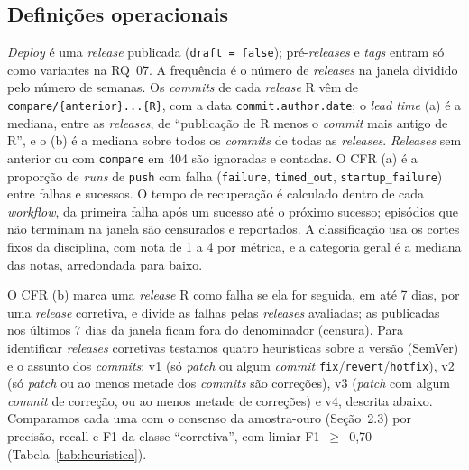
\subsection{Definições operacionais}

\textit{Deploy} é uma \textit{release} publicada (\texttt{draft = false}); pré-\textit{releases}
e \textit{tags} entram só como variantes na RQ~07. A frequência é o número de
\textit{releases} na janela dividido pelo número de semanas. Os \textit{commits} de cada
\textit{release} R vêm de \texttt{compare/\{anterior\}...\{R\}}, com a data
\texttt{commit.author.date}; o \textit{lead time} (a) é a mediana, entre as \textit{releases},
de ``publicação de R menos o \textit{commit} mais antigo de R'', e o (b) é a mediana sobre
todos os \textit{commits} de todas as \textit{releases}. \textit{Releases} sem anterior ou com
\texttt{compare} em 404 são ignoradas e contadas. O CFR (a) é a proporção de \textit{runs} de
\texttt{push} com falha (\texttt{failure}, \texttt{timed\_out}, \texttt{startup\_failure})
entre falhas e sucessos. O tempo de recuperação é calculado dentro de cada \textit{workflow},
da primeira falha após um sucesso até o próximo sucesso; episódios que não terminam na janela
são censurados e reportados. A classificação usa os cortes fixos da disciplina, com nota de
1 a 4 por métrica, e a categoria geral é a mediana das notas, arredondada para baixo.

O CFR (b) marca uma \textit{release} R como falha se ela for seguida, em até 7 dias, por uma
\textit{release} corretiva, e divide as falhas pelas \textit{releases} avaliadas; as
publicadas nos últimos 7 dias da janela ficam fora do denominador (censura). Para identificar
\textit{releases} corretivas testamos quatro heurísticas sobre a versão (SemVer) e o assunto
dos \textit{commits}: v1 (só \textit{patch} ou algum \textit{commit}
\texttt{fix}/\texttt{revert}/\texttt{hotfix}), v2 (só \textit{patch} ou ao menos metade dos
\textit{commits} são correções), v3 (\textit{patch} com algum \textit{commit} de correção, ou
ao menos metade de correções) e v4, descrita abaixo. Comparamos cada uma com o consenso da
amostra-ouro (Seção~2.3) por precisão, recall e F1 da classe ``corretiva'', com limiar
F1~$\geq$~0,70 (Tabela~\ref{tab:heuristica}).

